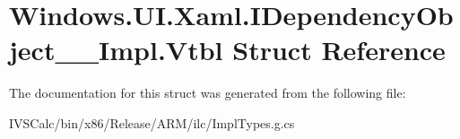 \hypertarget{struct_windows_1_1_u_i_1_1_xaml_1_1_i_dependency_object_____impl_1_1_vtbl}{}\section{Windows.\+U\+I.\+Xaml.\+I\+Dependency\+Object\+\_\+\+\_\+\+Impl.\+Vtbl Struct Reference}
\label{struct_windows_1_1_u_i_1_1_xaml_1_1_i_dependency_object_____impl_1_1_vtbl}


The documentation for this struct was generated from the following file\+:\begin{DoxyCompactItemize}
\item 
I\+V\+S\+Calc/bin/x86/\+Release/\+A\+R\+M/ilc/Impl\+Types.\+g.\+cs\end{DoxyCompactItemize}
